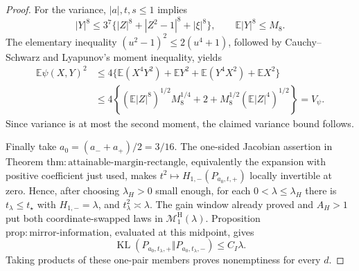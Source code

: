 \documentclass{article}
\begin{document}
\begin{proof}
For the variance, \(|a|,t,s\le1\) implies
\[
|Y|^8\le3^7\{|Z|^8+|Z^2-1|^8+|\xi|^8\},
\qquad \mathbb E|Y|^8\le M_8.
\]
The elementary inequality \((u^2-1)^2\le2(u^4+1)\), followed by Cauchy--Schwarz and Lyapunov's moment inequality, yields
\[
\begin{aligned}
\mathbb E\psi(X,Y)^2
&\le4\{\mathbb E(X^4Y^2)+\mathbb EY^2+\mathbb E(Y^4X^2)+\mathbb EX^2\}\\
&\le4\left\{(\mathbb E|Z|^8)^{1/2}M_8^{1/4}+2
+M_8^{1/2}(\mathbb E|Z|^4)^{1/2}\right\}=V_\psi.
\end{aligned}
\]
Since variance is at most the second moment, the claimed variance bound follows.

Finally take \(a_0=(a_-+a_+)/2=3/16\).  The one-sided Jacobian assertion in Theorem \(\mathrm{thm:attainable\text{-}margin\text{-}rectangle}\), equivalently the expansion with positive coefficient just used, makes \(t^2\mapsto H_{1,-}(P_{a_0,t,+})\) locally invertible at zero.  Hence, after choosing \(\lambda_H>0\) small enough, for each \(0<\lambda\le\lambda_H\) there is \(t_\lambda\le t_\star\) with \(H_{1,-}=\lambda\), and \(t_\lambda^2\asymp\lambda\).  The gain window already proved and \(A_H>1\) put both coordinate-swapped laws in \(\mathcal M_1^{\mathrm H}(\lambda)\).  Proposition \(\mathrm{prop:mirror\text{-}information}\), evaluated at this midpoint, gives
\[
\operatorname{KL}(P_{a_0,t_\lambda,+}\Vert P_{a_0,t_\lambda,-})
\le C_I\lambda.
\]
Taking products of these one-pair members proves nonemptiness for every \(d\).
\end{proof}
\end{document}
